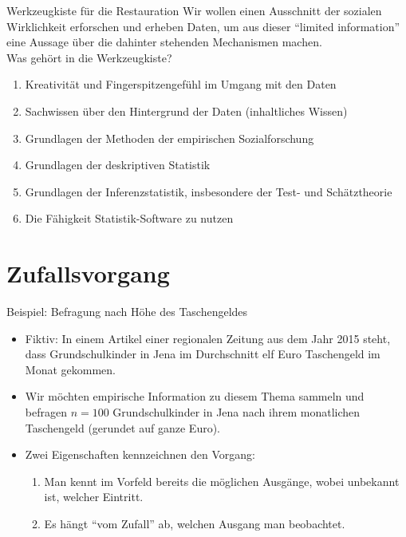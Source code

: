 \documentclass[usenames,dvipsnames,handout]{beamer}
\begin{document}
\begin{frame}{Werkzeugkiste für die Restauration}
Wir wollen einen Ausschnitt der sozialen Wirklichkeit erforschen und erheben Daten,
um aus dieser  ``limited information'' eine Aussage über die dahinter stehenden 
Mechanismen machen.\\
Was gehört in die Werkzeugkiste?\pause
\begin{enumerate}
\item{Kreativität und Fingerspitzengefühl im Umgang mit den Daten}\pause
\item{Sachwissen über den Hintergrund der Daten (inhaltliches Wissen)}\pause
\item{Grundlagen der Methoden der empirischen Sozialforschung}\pause
\item{Grundlagen der deskriptiven Statistik}\pause
\item{Grundlagen der Inferenzstatistik, insbesondere der Test- und Schätztheorie}\pause
\item{Die Fähigkeit Statistik-Software zu nutzen}
\end{enumerate}

\end{frame}

\section{Zufallsvorgang}%

\begin{frame}{Beispiel: Befragung nach Höhe des Taschengeldes}
\begin{itemize}
\item{Fiktiv: In einem Artikel einer regionalen Zeitung aus dem Jahr 2015 steht, dass Grundschulkinder in Jena im Durchschnitt
elf Euro Taschengeld im Monat gekommen.}\pause
\item{Wir möchten empirische Information zu diesem Thema sammeln und befragen 
$n=100$ Grundschulkinder in Jena nach ihrem monatlichen Taschengeld (gerundet auf ganze Euro).}\pause
\item{Zwei Eigenschaften kennzeichnen den Vorgang:}\pause
\begin{enumerate}
\item{Man kennt im Vorfeld bereits die möglichen Ausgänge, wobei unbekannt ist, welcher Eintritt.}
\item{Es hängt ``vom Zufall'' ab, welchen Ausgang man beobachtet.}
\end{enumerate}
\end{itemize}
\end{frame}
\end{document}
